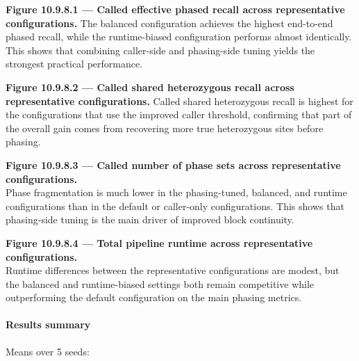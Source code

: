 \documentclass[
]{article}
\begin{document}
\textbf{Figure 10.9.8.1 --- Called effective phased recall across
representative configurations.} The balanced configuration achieves the
highest end-to-end phased recall, while the runtime-biased configuration
performs almost identically. This shows that combining caller-side and
phasing-side tuning yields the strongest practical performance.

\textbf{Figure 10.9.8.2 --- Called shared heterozygous recall across
representative configurations.} Called shared heterozygous recall is
highest for the configurations that use the improved caller threshold,
confirming that part of the overall gain comes from recovering more true
heterozygous sites before phasing.

\textbf{Figure 10.9.8.3 --- Called number of phase sets across
representative configurations.}\\
Phase fragmentation is much lower in the phasing-tuned, balanced, and
runtime configurations than in the default or caller-only
configurations. This shows that phasing-side tuning is the main driver
of improved block continuity.

\textbf{Figure 10.9.8.4 --- Total pipeline runtime across representative
configurations.}\\
Runtime differences between the representative configurations are
modest, but the balanced and runtime-biased settings both remain
competitive while outperforming the default configuration on the main
phasing metrics.

\paragraph{Results summary}\label{results-summary-7}

Means over 5 seeds:
\end{document}
